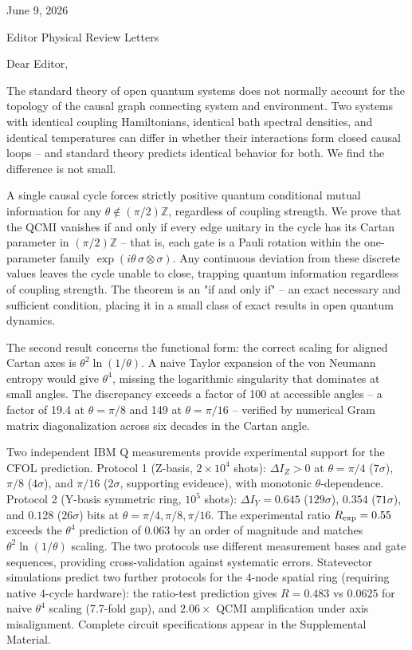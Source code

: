 \documentclass[11pt]{article}
\begin{document}
June 9, 2026

Editor
Physical Review Letters

Dear Editor,

The standard theory of open quantum systems does not normally account for the topology of the causal graph connecting system and environment. Two systems with identical coupling Hamiltonians, identical bath spectral densities, and identical temperatures can differ in whether their interactions form closed causal loops -- and standard theory predicts identical behavior for both. We find the difference is not small.

A single causal cycle forces strictly positive quantum conditional mutual information for any $\theta \notin (\pi/2)\mathbb{Z}$, regardless of coupling strength. We prove that the QCMI vanishes if and only if every edge unitary in the cycle has its Cartan parameter in $(\pi/2)\mathbb{Z}$ -- that is, each gate is a Pauli rotation within the one-parameter family $\exp(i\theta\,\sigma\otimes\sigma)$. Any continuous deviation from these discrete values leaves the cycle unable to close, trapping quantum information regardless of coupling strength. The theorem is an "if and only if" -- an exact necessary and sufficient condition, placing it in a small class of exact results in open quantum dynamics.

The second result concerns the functional form: the correct scaling for aligned Cartan axes is $\theta^2\ln(1/\theta)$. A naive Taylor expansion of the von Neumann entropy would give $\theta^4$, missing the logarithmic singularity that dominates at small angles. The discrepancy exceeds a factor of 100 at accessible angles -- a factor of 19.4 at $\theta=\pi/8$ and 149 at $\theta=\pi/16$ -- verified by numerical Gram matrix diagonalization across six decades in the Cartan angle.

Two independent IBM Q measurements provide experimental support for the CFOL prediction. Protocol 1 (Z-basis, $2\times10^4$ shots): $\Delta I_Z>0$ at $\theta=\pi/4$ ($7\sigma$), $\pi/8$ ($4\sigma$), and $\pi/16$ ($2\sigma$, supporting evidence), with monotonic $\theta$-dependence. Protocol 2 (Y-basis symmetric ring, $10^5$ shots): $\Delta I_Y = 0.645$ ($129\sigma$), $0.354$ ($71\sigma$), and $0.128$ ($26\sigma$) bits at $\theta=\pi/4,\pi/8,\pi/16$. The experimental ratio $R_{\rm exp}=0.55$ exceeds the $\theta^4$ prediction of $0.063$ by an order of magnitude and matches $\theta^2\ln(1/\theta)$ scaling. The two protocols use different measurement bases and gate sequences, providing cross-validation against systematic errors. Statevector simulations predict two further protocols for the 4-node spatial ring (requiring native 4-cycle hardware): the ratio-test prediction gives $R=0.483$ vs $0.0625$ for naive $\theta^4$ scaling (7.7-fold gap), and $2.06\times$ QCMI amplification under axis misalignment. Complete circuit specifications appear in the Supplemental Material.
\end{document}
